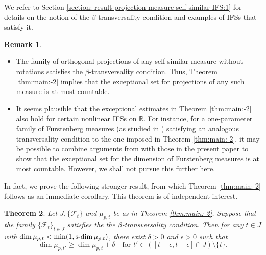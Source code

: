 \documentclass[a4paper,11pt]{amsart}
\newtheorem{theorem}{Theorem}[section]
\theoremstyle{definition}
\newtheorem{remark}[theorem]{Remark}
\numberwithin{equation}{section}
\def\F{\mathcal F}
\def\R{\mathbb R}
\DeclareMathOperator{\sd}{{\rm{s}\textrm{-}\rm{dim}}}
\begin{document}
 We refer to Section \ref{section: result-projection-measure-self-similar-IFS:1} for details on the notion of the $\beta$-transversality condition and examples of IFSs that satisfy it. 
\begin{remark}
\begin{itemize}
\item[(1)] The family of orthogonal projections of any self-similar measure without rotations satisfies the $\beta$-transversality condition. Thus, Theorem \ref{thm:main:-2} implies that the exceptional set for projections of any such measure is at most countable.
\item[(2)]  It seems plausible that the exceptional estimates in Theorem \ref{thm:main:-2} also hold for certain nonlinear IFSs on $\R$. For instance, for a one-parameter family of Furstenberg measures (as studied in \cite[Section 6.1]{HochmanSolomyak}) satisfying an analogous transversality condition to the one imposed in Theorem \ref{thm:main:-2}, it may be possible to combine arguments from \cite{HochmanSolomyak} with those in the present paper to show that the exceptional set for the dimension of Furstenberg measures is at most countable. However, we shall not pursue this further here.
\end{itemize}
\end{remark}
 
 
 
 In fact, we prove the following stronger result, from which Theorem \ref{thm:main:-2} follows as an immediate corollary. This theorem is of independent interest.
 \begin{theorem}\label{thm:main:pertubate-increase:1}
Let $J, \{\F_t\}$ and $\mu_{p,t}$ be as in Theorem \ref{thm:main:-2}.  Suppose that the family $\{\F_t\}_{t\in J}$ satisfies the the $\beta$-transversality condition.   Then for any $t\in J$ with $\dim \mu_{p,t}<\min (1,\sd \mu_{p,t})$,  there exist $\delta>0$ and $\epsilon>0$ such that 
\[
 \dim \mu_{p,t'} \ge \dim \mu_{p,t}+\delta  \  \  \  \textrm{ for } t'\in \left([t-\epsilon,t+\epsilon]\cap J\right)\setminus \{t\}. 
\]
\end{theorem}
 
\end{document}

